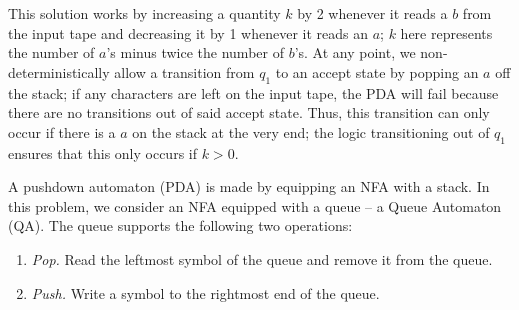 \documentclass[solution, letterpaper]{cs121}
\begin{document}
\begin{solution}
\begin{center}
\end{center}

This solution works by increasing a quantity $k$ by 2 whenever it reads a $b$ from the input tape and decreasing it by 1 whenever it reads an $a$; $k$ here represents the number of $a$'s minus twice the number of $b$'s.  At any point, we non-deterministically allow a transition from $q_1$ to an accept state by popping an $a$ off the stack; if any characters are left on the input tape, the PDA will fail because there are no transitions out of said accept state.  Thus, this transition can only occur if there is a $a$ on the stack at the very end; the logic transitioning out of $q_1$ ensures that this only occurs if $k > 0$.
\end{solution}


A pushdown automaton (PDA) is made by equipping an NFA with a stack. In this
problem, we consider an NFA equipped with a queue -- a Queue Automaton (QA).
The queue supports the following two operations:
\begin{enumerate}
  \item {\em Pop.} Read the leftmost symbol of the queue and remove it from
    the queue.
  \item {\em Push.} Write a symbol to the rightmost end of the queue.
\end{enumerate}
\end{document}
